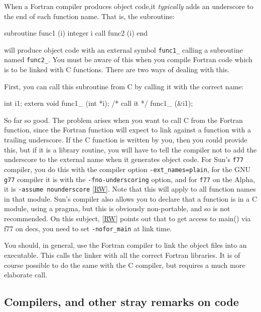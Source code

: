 \documentclass[11pt,oneside,chapters]{starlink}
\begin{document}
When a Fortran compiler produces object code,it
\emph{typically} adds an underscore to the end of each
function name.  That is, the subroutine:

\begin{terminalv}
      subroutine func1 (i)
      integer i
      call func2 (i)
      end
\end{terminalv}

will produce object code with an external symbol
\texttt{func1\_} calling a subroutine named
\texttt{func2\_}.  You must be aware of this when you
compile Fortran code which is to be linked with C
functions.  There are two ways of dealing with this.

First, you can call this subroutine from C by calling
it with the correct name:

\begin{terminalv}
int i1;
extern void func1_ (int *i);
/* call it */
func1_ (&i1);
\end{terminalv}

So far so good.  The problem arises when you want to
call C from the Fortran function, since the Fortran
function will expect to link against a function with a
trailing underscore.  If the C function is written by
you, then you could provide this, but if it is a library
routine, you will have to tell the compiler not to add
the underscore to the external name when it generates
object code.  For Sun's \texttt{f77} compiler, you
do this with the compiler option
\texttt{-ext\_names=plain}, for the GNU
\texttt{g77} compiler it is with the
\texttt{-fno-underscoring} option, and for
\texttt{f77} on the Alpha, it is \texttt{-assume nounderscore}
[\hyperlink{ta:rw}{RW}].  Note
that this will apply to all function names in that
module.  Sun's compiler also allows you to declare that
a function is in a C module, using a pragma, but this is
obviously non-portable, and so is not recommended.  On
this subject, [\hyperlink{ta:rw}{RW}] points out that
to get access to main() via f77 on decs, you need to set
\texttt{-nofor\_main} at link time.

You should, in general, use the Fortran compiler to
link the object files into an executable.  This calls
the linker with all the correct Fortran libraries.  It
is of course possible to do the same with the C
compiler, but requires a much more elaborate call.


\subsection{Compilers, and other stray remarks on code}
\label{s:compilers}
\end{document}

